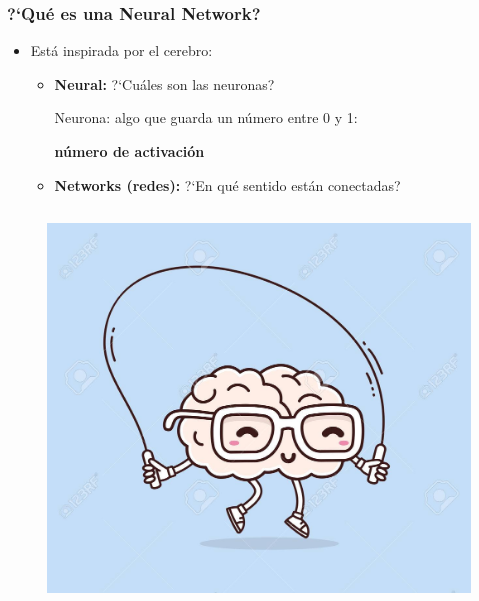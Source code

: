 \documentclass[10pt]{beamer}
\begin{document}
\begin{frame}
\frametitle{?`Qu\'e es una Neural Network?}
\begin{beamerboxesrounded}[upper=uppercolor, lower=lowercolor, shadow=true]{} 

\begin{itemize}
 \item  Est\'a inspirada por el cerebro:
 \begin{itemize}
  \item \textbf{Neural:} ?`Cu\'ales son las neuronas? 
  \centerline{Neurona: algo que guarda un n\'umero entre 0 y 1:}
  \centerline{\textbf{ n\'umero de activaci\'on}}
    \item \textbf{Networks (redes):} ?`En qu\'e sentido est\'an conectadas?
 \end{itemize}  
  
\end{itemize}
\end{beamerboxesrounded}

\begin{columns}
 \hspace*{-10mm}
 \hspace*{-10mm}

\begin{column}{.5\textwidth}
 \begin{figure}
 \begin{center}
  \includegraphics[scale=0.125]{./Figures/brain.jpg} 
 \end{center}
 \end{figure}  
\end{column}%


\end{columns}
\end{frame}
\end{document}
